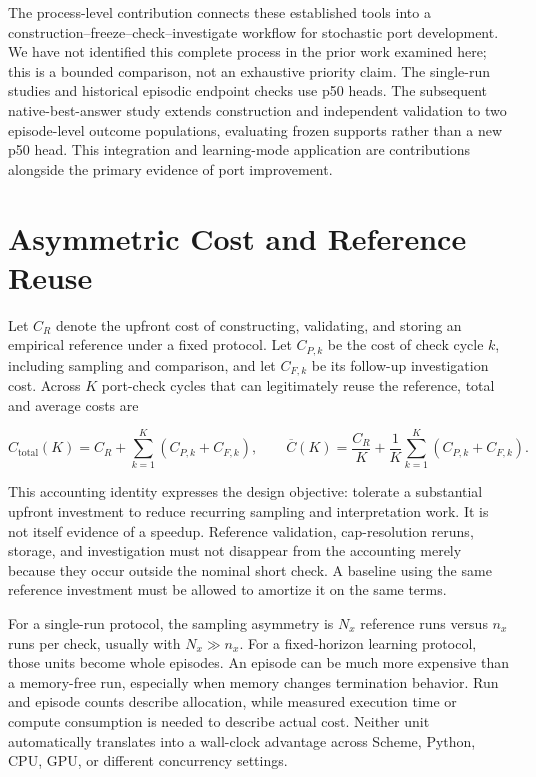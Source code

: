 \documentclass[10pt,letterpaper]{article}
\begin{document}
The process-level contribution connects these established tools into a
construction--freeze--check--investigate workflow for stochastic port development. We have
not identified this complete process in the prior work examined here; this is a bounded
comparison, not an exhaustive priority claim. The single-run studies and historical
episodic endpoint checks use p50 heads. The subsequent native-best-answer study extends
construction and independent validation to two episode-level outcome populations,
evaluating frozen supports rather than a new p50 head. This integration and learning-mode
application are contributions alongside the primary evidence of port improvement.

\section{Asymmetric Cost and Reference Reuse}\label{sec:amortization}

Let \(C_R\) denote the upfront cost of constructing, validating, and storing an empirical
reference under a fixed protocol. Let \(C_{P,k}\) be the cost of check cycle \(k\),
including sampling and comparison, and let \(C_{F,k}\) be its follow-up investigation
cost. Across \(K\) port-check cycles that can legitimately reuse the reference, total and
average costs are

\[
C_{\mathrm{total}}(K)=C_R+\sum_{k=1}^{K}(C_{P,k}+C_{F,k}),\qquad
\overline C(K)=\frac{C_R}{K}+\frac{1}{K}\sum_{k=1}^{K}(C_{P,k}+C_{F,k}).
\]

This accounting identity expresses the design objective: tolerate a substantial upfront
investment to reduce recurring sampling and interpretation work. It is not itself evidence
of a speedup. Reference validation, cap-resolution reruns, storage, and investigation must
not disappear from the accounting merely because they occur outside the nominal short
check. A baseline using the same reference investment must be allowed to amortize it on
the same terms.

For a single-run protocol, the sampling asymmetry is \(N_x\) reference runs versus \(n_x\)
runs per check, usually with \(N_x\gg n_x\). For a fixed-horizon learning protocol, those
units become whole episodes. An episode can be much more expensive than a memory-free run,
especially when memory changes termination behavior. Run and episode counts describe
allocation, while measured execution time or compute consumption is needed to describe
actual cost. Neither unit automatically translates into a wall-clock advantage across
Scheme, Python, CPU, GPU, or different concurrency settings.
\end{document}
